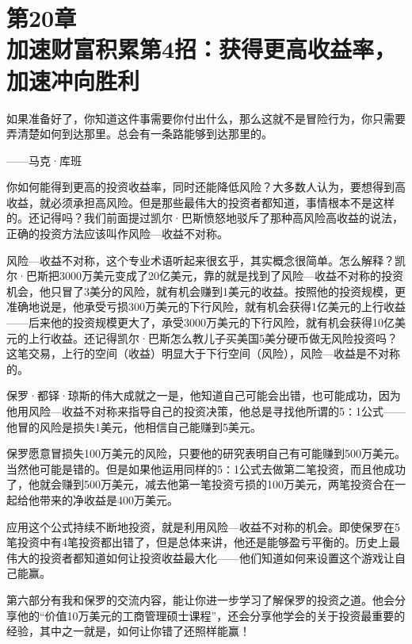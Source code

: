 
\section[第20章\q 加速财富积累第4招：获得更高收益率，加速冲向胜利]{第20章\\ 加速财富积累第4招：获得更高收益率，加速冲向胜利}

\begin{BookQuote}
如果准备好了，你知道这件事需要你付出什么，那么这就不是冒险行为，你只需要弄清楚如何到达那里。总会有一条路能够到达那里的。

\hfill ——马克·库班
\end{BookQuote}

你如何能得到更高的投资收益率，同时还能降低风险？大多数人认为，要想得到高收益，就必须承担高风险。但是那些最伟大的投资者都知道，事情根本不是这样的。还记得吗？我们前面提过凯尔·巴斯愤怒地驳斥了那种高风险高收益的说法，正确的投资方法应该叫作风险—收益不对称。

风险—收益不对称，这个专业术语听起来很玄乎，其实概念很简单。怎么解释？凯尔·巴斯把3000万美元变成了20亿美元，靠的就是找到了风险—收益不对称的投资机会，他只冒了3美分的风险，就有机会赚到1美元的收益。按照他的投资规模，更准确地说是，他承受亏损300万美元的下行风险，就有机会获得1亿美元的上行收益——后来他的投资规模更大了，承受3000万美元的下行风险，就有机会获得10亿美元的上行收益。还记得凯尔·巴斯怎么教儿子买美国5美分硬币做无风险投资吗？这笔交易，上行的空间（收益）明显大于下行空间（风险），风险—收益是不对称的。

保罗·都铎·琼斯的伟大成就之一是，他知道自己可能会出错，也可能成功，因为他用风险—收益不对称来指导自己的投资决策，他总是寻找他所谓的5∶1公式——他冒的风险是损失1美元，他相信自己能赚到5美元。

保罗愿意冒损失100万美元的风险，只要他的研究表明自己有可能赚到500万美元。当然他可能是错的。但是如果他运用同样的5∶1公式去做第二笔投资，而且他成功了，他就会赚到500万美元，减去他第一笔投资亏损的100万美元，两笔投资合在一起给他带来的净收益是400万美元。

应用这个公式持续不断地投资，就是利用风险—收益不对称的机会。即使保罗在5笔投资中有4笔投资都出错了，但是总体来讲，他还是能够盈亏平衡的。历史上最伟大的投资者都知道如何让投资收益最大化——他们知道如何来设置这个游戏让自己能赢。

第六部分有我和保罗的交流内容，能让你进一步学习了解保罗的投资之道。他会分享他的“价值10万美元的工商管理硕士课程”，还会分享他学会的关于投资最重要的经验，其中之一就是，如何让你错了还照样能赢！

